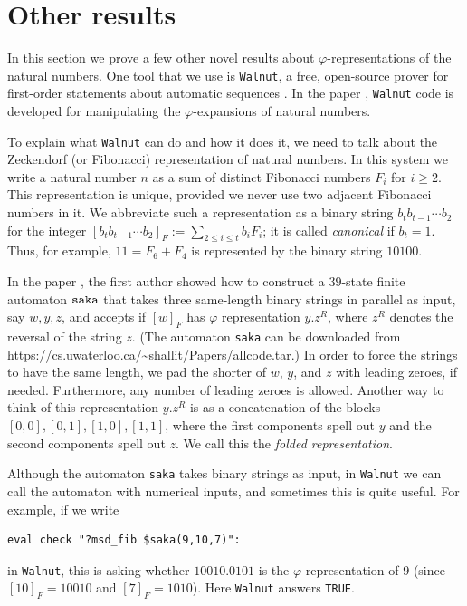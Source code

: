 \documentclass[12pt,reqno]{article}
\begin{document}
\section{Other results}

In this section we prove a few other novel results about $\varphi$-representations of the natural numbers.
One tool that we use is {\tt Walnut}, a free, open-source prover for first-order statements about automatic
    sequences \cite{Mousavi:2021,Shallit:2023}.   In the paper 
    \cite{Shallit:2025}, {\tt Walnut} code is developed for manipulating the $\varphi$-expansions of natural numbers.

To explain what {\tt Walnut} can do and how it does it, we need to talk about the Zeckendorf (or Fibonacci) representation of natural numbers.  In this system \cite{Lekkerkerker:1952,Zeckendorf:1972} we write a natural number $n$ as a sum of distinct Fibonacci numbers $F_i$ for $i \geq 2$.  This representation is unique, provided we never use two adjacent Fibonacci numbers in it.  We abbreviate such a representation as a binary string
$b_t b_{t-1} \cdots b_2$ for the integer
$[b_t b_{t-1} \cdots b_2]_F := \sum_{2 \leq i \leq t} b_i F_i$; it is called {\it canonical} if $b_t= 1$. Thus, for example, $11 = F_6 + F_4$ is represented by the binary string
$10100$.   

In the paper \cite{Shallit:2025}, the first author showed how to construct a $39$-state finite automaton ${\tt saka}$ that takes three same-length binary strings in parallel as input, say $w,y,z$,
and accepts if $[w]_F$ has $\varphi$
representation $y.z^R$, where $z^R$ denotes the reversal of the string $z$. (The automaton {\tt saka} can be downloaded from \url{https://cs.uwaterloo.ca/~shallit/Papers/allcode.tar}.) In order to force the strings to have the same length, we pad the shorter of $w$, $y$, and $z$ with leading zeroes, if needed.
Furthermore, any number of leading zeroes is allowed.
Another way to think of this representation $y.z^R$ is
as a concatenation of the blocks $[0,0],[0,1],[1,0],[1,1]$, where the first components spell out $y$
and the second components spell out $z$.  We call this the {\it folded representation}.

Although the automaton {\tt saka} takes binary strings as input, in {\tt Walnut} we can call the automaton with numerical inputs, and sometimes this is quite useful.  
For example, if we write
\begin{verbatim}
eval check "?msd_fib $saka(9,10,7)":
\end{verbatim}
in {\tt Walnut}, this is asking whether $10010.0101$
is the $\varphi$-representation of $9$ (since
$[10]_F = 10010$ and $[7]_F = 1010$). Here {\tt Walnut} answers {\tt TRUE}.
\end{document}
